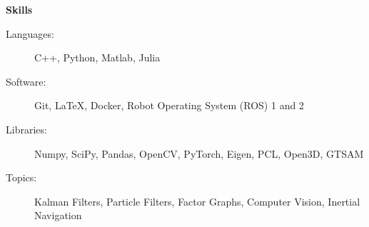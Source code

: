\documentclass[letterpaper,11pt]{article}
\newcommand{\resheading}[1]{\vspace{10pt} \Large \textbf{#1} \normalsize}
\begin{document}
\resheading{Skills}

\begin{description}
\item[Languages:]
C++, Python, Matlab, Julia
\item[Software:]
Git, \LaTeX, Docker, Robot Operating System (ROS) 1 and 2
\item[Libraries:]
Numpy, SciPy, Pandas, OpenCV, PyTorch, Eigen, PCL, Open3D, GTSAM
\item[Topics:]
Kalman Filters, Particle Filters, Factor Graphs, Computer Vision, Inertial Navigation 
\end{description}
\end{document}
